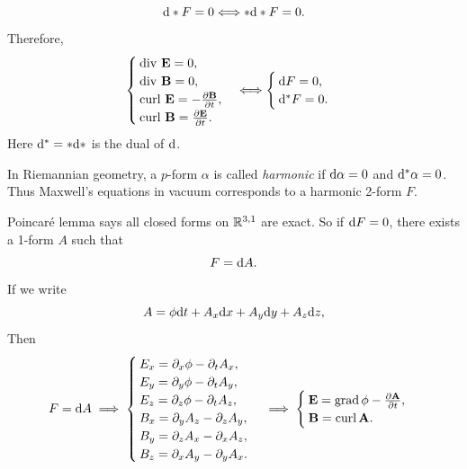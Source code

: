\begin{equation*}
    {\rm d}\ast F=0 \Longleftrightarrow \ast{\rm d}\ast F=0.
\end{equation*}
Therefore, 
\begin{equation*}
    \begin{cases}
        \mathrm{div}\ \mathbf{E} = 0, \\
        \mathrm{div}\ \mathbf{B} = 0, \\
        \mathrm{curl}\ \mathbf{E} = -\frac{\partial \mathbf{B}}{\partial t}, \\
        \mathrm{curl}\ \mathbf{B} = \frac{\partial \mathbf{E}}{\partial t}.
    \end{cases}
    \Longleftrightarrow
    \begin{cases}
        {\rm d} F = 0, \\
        {\rm d}^* F = 0.
    \end{cases}
\end{equation*} 
Here ${\rm d}^* = \ast{\rm d}\ast$ is the dual of ${\rm d}$. 

In Riemannian geometry, a $p$-form $\alpha$ is called \textit{harmonic} if ${\rm d}\alpha = 0$ and ${\rm d}^*\alpha = 0$.
Thus Maxwell's equations in vacuum corresponds to a harmonic 2-form $F$. 

Poincar\'e lemma says all closed forms on $\mathbb{R}^{3,1}$ are exact. So if ${\rm d} F=0$, there exists a 1-form $A$ such that 
\begin{equation*}
    F = {\rm d} A.
\end{equation*}
If we write 
\begin{equation*}
    A = \phi{\rm d} t + A_x{\rm d} x + A_y{\rm d} y + A_z{\rm d} z,
\end{equation*}
Then
\begin{equation*}
    F = {\rm d} A \implies
    \begin{cases}
        E_x = \partial_x\phi - \partial_t A_x, \\
        E_y = \partial_y\phi - \partial_t A_y, \\
        E_z = \partial_z\phi - \partial_t A_z, \\
        B_x = \partial_y A_z - \partial_z A_y, \\
        B_y = \partial_z A_x - \partial_x A_z, \\
        B_z = \partial_x A_y - \partial_y A_x.
    \end{cases} \implies
    \begin{cases}
        \mathbf{E} = \mathrm{grad}\,\phi - \frac{\partial \mathbf{A}}{\partial t}, \\
        \mathbf{B} = \mathrm{curl}\,\mathbf{A}.
    \end{cases}
\end{equation*}

